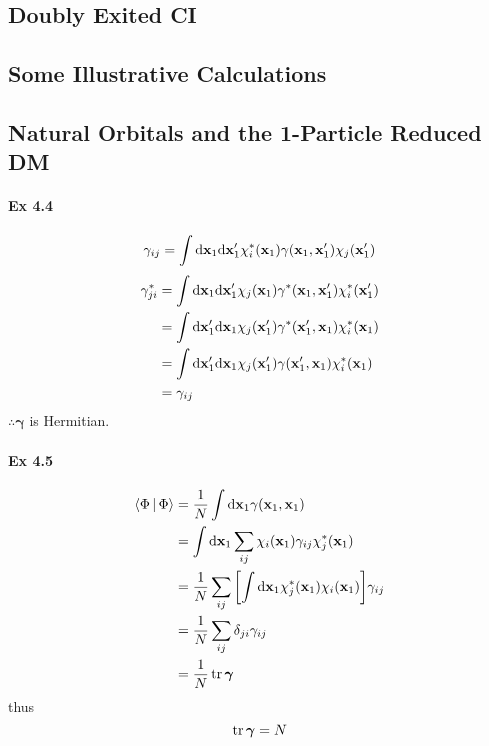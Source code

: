 \documentclass[a4paper]{article}
\newcommand{\ex}[1]{\paragraph{Ex #1}}
\numberwithin{equation}{subsection}
\begin{document}
\subsection{Doubly Exited CI}

\subsection{Some Illustrative Calculations}

\subsection{Natural Orbitals and the 1-Particle Reduced DM}
\ex{4.4}
\begin{equation}\label{key}
\gamma_{ij} = \int\dd\vb{x}_1\dd\vb{x}'_1 \chi_i^*(\vb{x}_1) \gamma(\vb{x}_1,\vb{x}'_1) \chi_j(\vb{x}'_1)
\end{equation}
\begin{align}
\gamma_{ji}^* &= \int\dd\vb{x}_1\dd\vb{x}'_1 \chi_j(\vb{x}_1) \gamma^*(\vb{x}_1,\vb{x}'_1) \chi_i^*(\vb{x}'_1) \notag\\
&= \int\dd\vb{x}'_1\dd\vb{x}_1 \chi_j(\vb{x}'_1) \gamma^*(\vb{x}'_1,\vb{x}_1) \chi_i^*(\vb{x}_1) \notag\\
&= \int\dd\vb{x}'_1\dd\vb{x}_1 \chi_j(\vb{x}'_1) \gamma(\vb{x}'_1,\vb{x}_1) \chi_i^*(\vb{x}_1) \notag\\
&= \gamma_{ij}
\end{align}
$ \therefore \bm\gamma$ is Hermitian.

\ex{4.5}
\begin{align}
\Braket{\Phi | \Phi} 
&= \dfrac{1}{N} \int\dd\vb{x}_1  \gamma(\vb{x}_1,\vb{x}_1) \notag\\
&= \int\dd\vb{x}_1  \sum_{ij} \chi_i(\vb{x}_1) \gamma_{ij} \chi_j^*(\vb{x}_1) \notag\\
&= \dfrac{1}{N} \sum_{ij} \qty[\int\dd\vb{x}_1 \chi_j^*(\vb{x}_1) \chi_i(\vb{x}_1)] \gamma_{ij}  \notag\\
&= \dfrac{1}{N} \sum_{ij} \delta_{ji} \gamma_{ij} \notag\\
&= \dfrac{1}{N} \tr \bm\gamma
\end{align}
thus
\begin{equation}\label{key}
\tr \bm\gamma = N
\end{equation}
\end{document}

